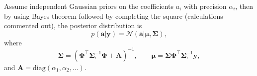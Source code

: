 \documentclass[a4paper]{article}
\begin{document}
Assume independent Gaussian priors on the coefficients $a_i$ with precision $\alpha_i$, then by using Bayes theorem followed by completing the square (calculations commented out), the posterior distribution is
\begin{equation}
    p(\mathbf{a}|\mathbf{y}) = \mathcal{N}(\mathbf a |\mathbf{\mu}, \mathbf{\Sigma}),
\end{equation}
where
\begin{equation} \label{eq:posterior}
    \mathbf{\Sigma} = (\mathbf{\Phi}^\top \mathbf{\Sigma}_\epsilon^{-1} \mathbf{\Phi} + \mathbf{A})^{-1}, \qquad
    \mathbf{\mu} = \mathbf{\Sigma} \mathbf{\Phi}^\top \mathbf{\Sigma}_\epsilon^{-1} \mathbf{y},
\end{equation}
and $\mathbf{A} = \mathrm{diag}(\alpha_1, \alpha_2, \dots)$.


\end{document}
